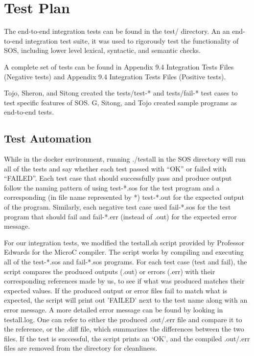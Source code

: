 \documentclass[main.tex]{subfiles}
\begin{document}
	\section{Test Plan}
	
	The end-to-end integration tests can be found in the test/ directory. An an end-to-end integration test suite, it was used to rigorously test the functionality of SOS, including lower level lexical, syntactic, and semantic checks.
	
	A complete set of tests can be found in Appendix 9.4 Integration Tests Files (Negative tests) and Appendix 9.4 Integration Tests Files (Positive tests).
	
	Tojo, Sheron, and Sitong created the tests/test-* and tests/fail-* test cases to test specific features of SOS. G, Sitong, and Tojo created sample programs as end-to-end tests.
	
	\subsection{Test Automation}
	
	While in the docker environment, running ./testall in the SOS directory will run all of the tests and say whether each test passed with “OK” or failed with “FAILED”. Each test case that should successfully pass and produce output follow the naming pattern of using test-*.sos for the test program and a corresponding (in file name represented by *) test-*.out for the expected output of the program. Similarly, each negative test case used fail-*.sos for the test program that should fail and fail-*.err (instead of .out) for the expected error message.

	For our integration tests, we modified the testall.sh script provided by Professor Edwards for the MicroC compiler. The script works by compiling and executing all of the test-*.sos and fail-*.sos programs. For each test case (test and fail), the script compares the produced outputs (.out) or errors (.err) with their corresponding references made by us, to see if what was produced  matches their expected values. If the produced output or error files fail to match what is expected, the script will print out 'FAILED' next to the test name along with an error message. A more detailed error message can be found by looking in testall.log. One can refer to either the produced .out/.err file and compare it to the reference, or the .diff file, which summarizes the differences between the two files. If the test is successful, the script prints an ‘OK’, and the compiled .out/.err files are removed from the directory for cleanliness.
	
\end{document}
